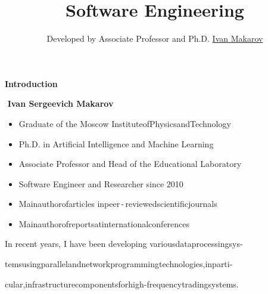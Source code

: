 \documentclass{beamer}
\begin{document}
\title{\bf Software Engineering} 

\author{Developed by Associate Professor and Ph.D. \href{https://t.me/i_s_m_mipt}{\color{G} Ivan Makarov}}

\date{}

\frame{\titlepage}



\begin{frame}{\bf Introduction}

    \textbf{\;\;\;\;\;\;\,\,Ivan Sergeevich Makarov}

    \bigskip
    
    \begin{itemize}

        \item Graduate of the Moscow Institute\;of\;Physics\;and\;Technology

        \item Ph.D. in Artificial Intelligence and Machine Learning

        \item Associate Professor and Head of the Educational Laboratory

        \item Software Engineer and Researcher since 2010

        \item Main\:author\:of\:articles in\:peer\,-\,reviewed\;scientific\;journals
    
        \item Main\:author\:of\:reports\:at\:international\:conferences
        
    \end{itemize}

    \begin{block}
    \justifying In recent years, I have been developing various\;data\;processing\;sys-
    
    tems\;using\;parallel\;and\;network\;programming\;technologies,\;in\;parti-
    
    cular,\:infrastructure\:components\:for\:high-frequency\:trading\:systems.
    \end{block}
    
\end{frame}
\end{document}

